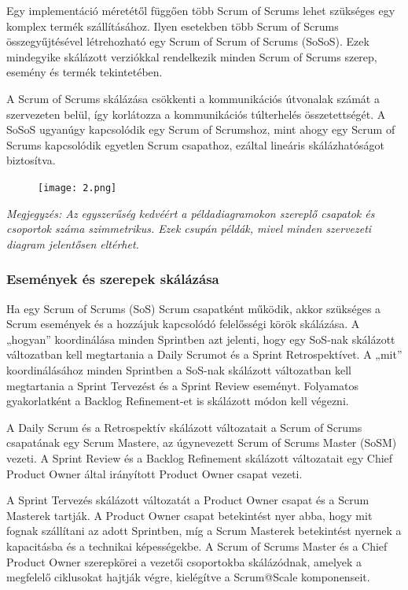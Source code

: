\documentclass[12pt,a4paper,parskip=full]{scrartcl}
\begin{document}
Egy implementáció méretétől függően több Scrum of Scrums lehet szükséges egy komplex termék szállításához. Ilyen esetekben több Scrum of Scrums összegyűjtésével létrehozható egy Scrum of Scrum of Scrums (SoSoS). Ezek mindegyike skálázott verziókkal rendelkezik minden Scrum of Scrums szerep, esemény és termék tekintetében.

A Scrum of Scrums skálázása csökkenti a kommunikációs útvonalak számát a szervezeten belül, így korlátozza a kommunikációs túlterhelés összetettségét. A SoSoS ugyanúgy kapcsolódik egy Scrum of Scrumshoz, mint ahogy egy Scrum of Scrums kapcsolódik egyetlen Scrum csapathoz, ezáltal lineáris skálázhatóságot biztosítva.

\begin{figure}[H]
    \centering
    \texttt{[image: 2.png]}  
\end{figure}

\emph{
Megjegyzés: Az egyszerűség kedvéért a példadiagramokon szereplő csapatok és csoportok száma szimmetrikus. Ezek csupán példák, mivel minden szervezeti diagram jelentősen eltérhet.
}

\subsubsection{Események és szerepek skálázása}\label{scaling-the-events-and-roles}

Ha egy Scrum of Scrums (SoS) Scrum csapatként működik, akkor szükséges a Scrum események és a hozzájuk kapcsolódó felelősségi körök skálázása. A „hogyan” koordinálása minden Sprintben azt jelenti, hogy egy SoS-nak skálázott változatban kell megtartania a Daily Scrumot és a Sprint Retrospektívet. A „mit” koordinálásához minden Sprintben a SoS-nak skálázott változatban kell megtartania a Sprint Tervezést és a Sprint Review eseményt. Folyamatos gyakorlatként a Backlog Refinement-et is skálázott módon kell végezni.

A Daily Scrum és a Retrospektív skálázott változatait a Scrum of Scrums csapatának egy Scrum Mastere, az úgynevezett Scrum of Scrums Master (SoSM) vezeti. A Sprint Review és a Backlog Refinement skálázott változatait egy Chief Product Owner által irányított Product Owner csapat vezeti. 

A Sprint Tervezés skálázott változatát a Product Owner csapat és a Scrum Masterek tartják. A Product Owner csapat betekintést nyer abba, hogy mit fognak szállítani az adott Sprintben, míg a Scrum Masterek betekintést nyernek a kapacitásba és a technikai képességekbe. A Scrum of Scrums Master és a Chief Product Owner szerepkörei a vezetői csoportokba skálázódnak, amelyek a megfelelő ciklusokat hajtják végre, kielégítve a Scrum@Scale komponenseit.
\end{document}

